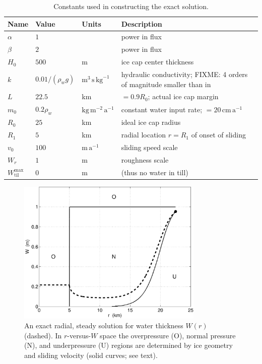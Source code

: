 \documentclass[gmd]{copernicus}   %
\newcommand{\text}{\textrm}
\newcommand{\Wtilmax}{W_{\text{til}}^{\text{max}}}
\begin{document}
\begin{table}[ht]
  \centering
  \caption{Constants used in constructing the exact solution.}
  \begin{tabular}{lllp{3.0in}}
    \textbf{Name} & \textbf{Value} & \textbf{Units} & \textbf{Description}\\
\hline
    $\alpha$ & $1$ & & power in flux \\
    $\beta$  & $2$ & & power in flux \\
    $H_0$ & $500$ & m & ice cap center thickness \\
    $k$   & $0.01/(\rho_w g)$ & $\text{m}^3\,\text{s}\,\text{kg}^{-1}$ & hydraulic conductivity; FIXME: 4 orders of magnitude smaller than in \cite{Hewittetal2012} \\
    $L$   & $22.5$& km & $=0.9 R_0$; actual ice cap margin \\
    $m_0$ & $0.2\rho_w$ & $\text{kg}\,\text{m}^{-2}\,\text{a}^{-1}$ & constant water input rate; $= 20 \,\text{cm}\,\text{a}^{-1}$ \\
    $R_0$ & $25$  & km & ideal ice cap radius \\
    $R_1$ & $5$   & km & radial location $r=R_1$ of onset of sliding \\
    $v_0$ & $100$ & $\text{m}\,\text{a}^{-1}$ & sliding speed scale \\
    $W_r$ & $1$ & m & roughness scale \\
    $\Wtilmax$ & 0 & m & (thus no water in till) \\
    \hline
  \end{tabular}
 \label{tab:verifconstants}
\end{table}

\begin{figure}[ht]
\includegraphics[width=3.5in,keepaspectratio=true]{exact-W-plot-onu}
\caption{An exact radial, steady solution for water thickness $W(r)$ (dashed).  In $r$-versus-$W$ space the overpressure (O), normal pressure (N), and underpressure (U) regions are determined by ice geometry and sliding velocity (solid curves; see text).}
\label{fig:Wexact}
\end{figure}
\end{document}
